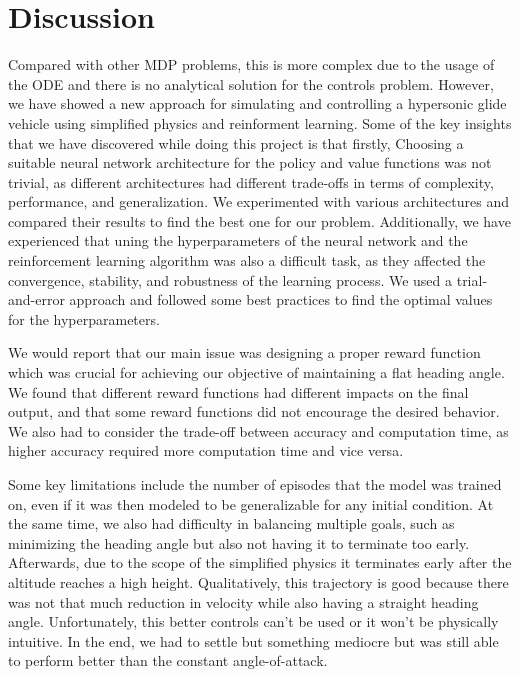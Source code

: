 \documentclass[11pt]{article} %
\begin{document}
\section{Discussion}
Compared with other MDP problems, this is more complex due to the usage of the ODE and there is no analytical solution 
for the controls problem. However, we have showed a new approach for simulating and controlling a hypersonic glide vehicle using simplified physics
and reinforment learning. Some of the key insights that we have discovered while doing this project is that firstly, Choosing a suitable neural network 
architecture for the policy and value functions was not trivial, as different architectures had different trade-offs in terms of complexity, 
performance, and generalization. We experimented with various architectures and compared their results to find the best one for our problem. Additionally, we have experienced that
uning the hyperparameters of the neural network and the reinforcement learning algorithm was also a difficult task, as they affected the convergence, stability, and robustness 
of the learning process. We used a trial-and-error approach and followed some best practices to find the optimal values for the hyperparameters.

We would report that our main issue was designing a proper reward function which was crucial for achieving our objective of maintaining a flat heading angle. 
We found that different reward functions had different impacts on the final output, and that some reward functions did not encourage the desired behavior. 
We also had to consider the trade-off between accuracy and computation time, as higher accuracy required more computation time and vice versa.

Some key limitations include the number of episodes that the model was trained on, even if it was then modeled to be generalizable for any initial condition. At the same time,
we also had difficulty in balancing multiple goals, such as minimizing the heading angle but also not having it to terminate too early. Afterwards, due to the scope of the simplified physics
it terminates early after the altitude reaches a high height. Qualitatively, this trajectory is good because there was not that much reduction in velocity while also having a straight heading angle.
Unfortunately, this better controls can't be used or it won't be physically intuitive. In the end, we had to settle but something mediocre but was still able to perform better than the constant angle-of-attack.
\end{document}
